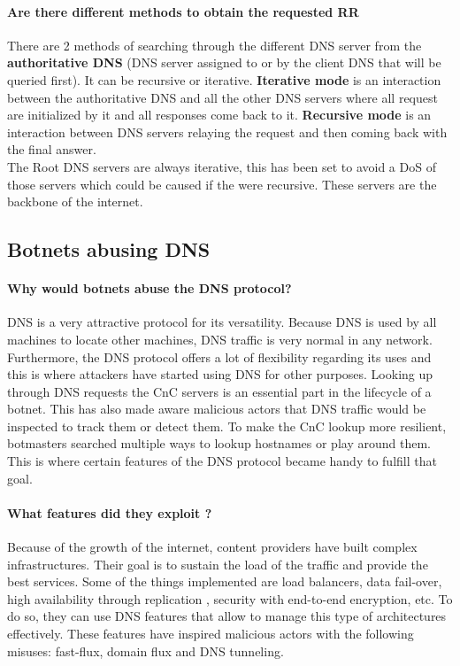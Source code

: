 \paragraph{Are there different methods to obtain the requested RR}
There are 2 methods of searching through the different DNS server from the \textbf{authoritative DNS} (DNS server assigned to or by the client DNS that will be queried first). It can be recursive or iterative. \textbf{Iterative mode} is an interaction between the authoritative DNS and all the other DNS servers where all request are initialized by it and all responses come back to it. \textbf{Recursive mode} is an interaction between DNS servers relaying the request and then coming back with the final answer. \\The Root DNS servers are always iterative, this has been set to avoid a DoS of those servers which could be caused if the were recursive. These servers are the backbone of the internet.

\subsection{Botnets abusing DNS}

\paragraph{Why would botnets abuse the DNS protocol?}
DNS is a very attractive protocol for its versatility. Because DNS is used by all machines to locate other machines, DNS traffic is very normal in any network. Furthermore, the DNS protocol offers a lot of flexibility regarding its uses and this is where attackers have started using DNS for other purposes.
Looking up through DNS requests the CnC servers is an essential part in the lifecycle of a botnet. This has also made aware malicious actors that DNS traffic would be inspected to track them or detect them. To make the CnC lookup more resilient, botmasters searched multiple ways to lookup hostnames or play around them. This is where certain features of the DNS protocol became handy to fulfill that goal.
\paragraph{What features did they exploit ?}
Because of the growth of the internet, content providers have built complex infrastructures. Their goal is to sustain the load of the traffic and provide the best services. Some of the things implemented are load balancers, data fail-over, high availability through replication , security with end-to-end encryption, etc. To do so, they can use DNS features that allow to manage this type of architectures effectively. These features have inspired malicious actors with the following misuses: fast-flux, domain flux and DNS tunneling.

